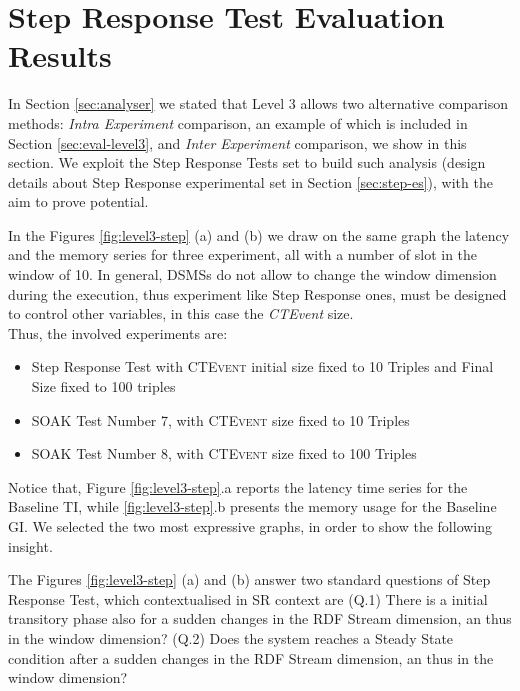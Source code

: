 \section{Step Response Test Evaluation Results}\label{sec:stressres}

In Section \ref{sec:analyser} we stated that Level 3 allows two alternative comparison methods: \textit{Intra Experiment} comparison, an example of which is included in Section \ref{sec:eval-level3}, and \textit{Inter Experiment} comparison, we show in this section. We exploit the Step Response Tests set to build such analysis (design details about Step Response experimental set in Section \ref{sec:step-es}), with the aim to prove \name potential.

In the Figures \ref{fig:level3-step} (a) and (b) we draw on the same graph the latency and the memory series for three experiment, all with a number of slot in the window of 10. In general, DSMSs do not allow to change the window dimension during the execution, thus experiment like Step Response ones, must be designed to control other variables, in this case the \textit{CTEvent} size. \\


Thus, the involved experiments are:

\begin{itemize}
\item Step Response Test with \textsc{CTEvent} initial size fixed to 10 Triples and Final Size fixed to 100 triples
\item SOAK Test Number 7, with \textsc{CTEvent} size fixed to 10 Triples
\item SOAK Test Number 8, with \textsc{CTEvent} size fixed to 100 Triples
\end{itemize}

Notice that, Figure \ref{fig:level3-step}.a reports the latency time series for the Baseline TI, while \ref{fig:level3-step}.b presents the memory usage for the Baseline GI. We selected the two most expressive graphs, in order to show the following insight.

The Figures \ref{fig:level3-step} (a) and (b) answer two standard questions of Step Response Test, which contextualised in SR context are (Q.1) There is a initial transitory phase also for a sudden changes in the RDF Stream dimension, an thus in the window dimension? (Q.2) Does the system reaches a Steady State condition after a sudden changes in the RDF Stream dimension, an thus in the window dimension?

